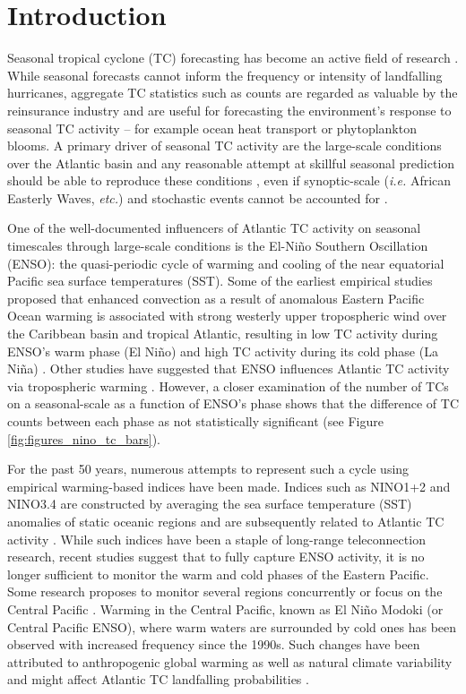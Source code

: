 \section{Introduction}
Seasonal tropical cyclone (TC) forecasting has become an active field of research \cite{elsner1993, elsner1998, elsner2008, klotzbach2009}. While seasonal forecasts cannot inform the frequency or intensity of landfalling hurricanes, aggregate TC statistics such as counts are regarded as valuable by the reinsurance industry and are useful for forecasting the environment's response to seasonal TC activity -- for example ocean heat transport or phytoplankton blooms. A primary driver of seasonal TC activity are the large-scale conditions over the Atlantic basin and any reasonable attempt at skillful seasonal prediction should be able to reproduce these conditions \cite{gray1968}, even if synoptic-scale (\emph{i.e.} African Easterly Waves, \emph{etc.}) and stochastic events cannot be accounted for \cite{Knutson2007, Emanuel2008Simulation}.

One of the well-documented influencers of Atlantic TC activity on seasonal timescales through large-scale conditions is the El-Ni\~no Southern Oscillation (ENSO): the quasi-periodic cycle of warming and cooling of the near equatorial Pacific sea surface temperatures (SST). Some of the earliest empirical studies proposed that enhanced convection as a result of anomalous Eastern Pacific Ocean warming is associated with strong westerly upper tropospheric wind over the Caribbean basin and tropical Atlantic, resulting in low TC activity during ENSO's warm phase (El Ni\~no) and high TC activity during its cold phase (La Ni\~na) \cite{gray1984a}. Other studies have suggested that ENSO influences Atlantic TC activity via tropospheric warming \cite{tang2004}. However, a closer examination of the number of TCs on a seasonal-scale as a function of ENSO's phase shows that the difference of TC counts between each phase as not statistically significant (see Figure \ref{fig:figures_nino_tc_bars}).

For the past 50 years, numerous attempts to represent such a cycle using empirical warming-based indices have been made. Indices such as NINO1+2 and NINO3.4 are constructed by averaging the sea surface temperature (SST) anomalies of static oceanic regions and are subsequently related to Atlantic TC activity \cite{trenberth1997definition}. While such indices have been a staple of long-range teleconnection research, recent studies suggest that to fully capture ENSO activity, it is no longer sufficient to monitor the warm and cold phases of the Eastern Pacific. Some research proposes to monitor several regions concurrently \cite{trenberth2001,ren2011} or focus on the Central Pacific \cite{ashok2007}. Warming in the Central Pacific, known as El Ni\~no Modoki (or Central Pacific ENSO), where warm waters are surrounded by cold ones has been observed with increased frequency since the 1990s. Such changes have been attributed to anthropogenic global warming \cite{yeh2009} as well as natural climate variability \cite{wittenberg2009} and might affect Atlantic TC landfalling probabilities \cite{kim2009}. 


